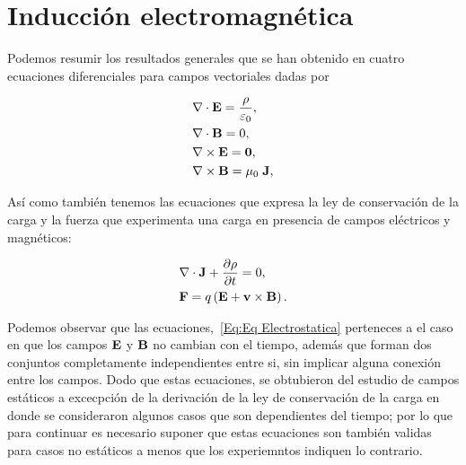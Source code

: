 \chapter{Inducción electromagnética}
Podemos resumir los resultados generales que se han obtenido en cuatro ecuaciones diferenciales para campos vectoriales dadas por

\begin{equation}
	\label{Eq:Eq Electrostatica}
	\begin{aligned}
		 & \nabla \cdot \textbf{E} = \frac{\rho}{\varepsilon_{0}}, \\
		 & \nabla \cdot \textbf{B} = 0,                            \\
		 & \nabla \times \textbf{E} = \textbf{0},                   \\
		 & \nabla \times \textbf{B} = \mu_{0}\; \textbf{J},
	\end{aligned}
\end{equation}

Así como también tenemos las ecuaciones que expresa la ley de conservación de la carga y la fuerza que experimenta una carga en presencia de campos eléctricos y magnéticos:

\begin{align}
	 & \divergence{\textbf{J}} + \diffp{\rho}{t} = 0,           \\
	 & \textbf{F} = q \left( \E + \textbf{v} \times \B \right).
\end{align}

Podemos observar que las ecuaciones,~\eqref{Eq:Eq Electrostatica} perteneces a el caso en que los campos $\textbf{E}$ y $\textbf{B}$ no cambian con el tiempo, además que forman dos conjuntos completamente independientes entre si, sin implicar alguna conexión entre los campos. Dodo que estas ecuaciones, se obtubieron del estudio de campos estáticos a excecpción de la derivación de la ley de conservación de la carga en donde se consideraron algunos casos que son dependientes del tiempo; por lo que para continuar es necesario suponer que estas ecuaciones son también validas para casos no estáticos a menos que los experiemntos indiquen lo contrario.



